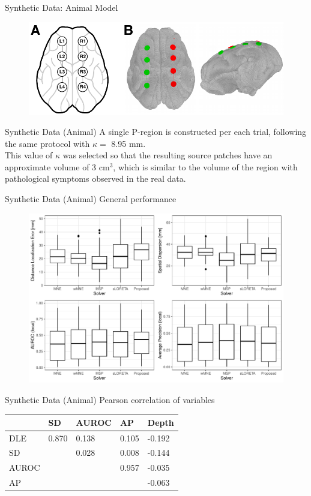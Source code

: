\documentclass[progressbar=head]{beamer}
\begin{document}
\begin{frame}{Synthetic Data: Animal Model}
\begin{figure}
\centering
\includegraphics[width=0.8\linewidth]{./img/electrodes_pig.pdf}
\end{figure}
\end{frame}

\begin{frame}{Synthetic Data (Animal)}
A single P-region is constructed per each trial, following the same protocol with $\kappa =$ 8.95 mm.\\

This value of $\kappa$ was selected so that the resulting source patches have an approximate volume of 3 $\text{cm}^3$, which is similar to the volume of the region with pathological symptoms observed in the real data.
\end{frame}

\begin{frame}{Synthetic Data (Animal)}
General performance
\begin{figure}
    \centering
    \includegraphics[width=0.7\linewidth]{img_stats/pig_plot_EvalMetrics_protocol04_vol5k_pigALL.pdf}
\end{figure}
\end{frame}

\begin{frame}{Synthetic Data (Animal)}
Pearson correlation of variables
\begin{table}[]
\centering
\begin{tabular}{@{}lllll@{}}
\toprule
      & SD    & AUROC & AP    & Depth  \\
\midrule
DLE   & 0.870 & 0.138 & 0.105 & -0.192 \\
SD    &       & 0.028 & 0.008 & -0.144 \\
AUROC &       &       & 0.957 & -0.035 \\
AP    &       &       &       & -0.063 \\
\bottomrule
\end{tabular}
\end{table}
\end{frame}
\end{document}
